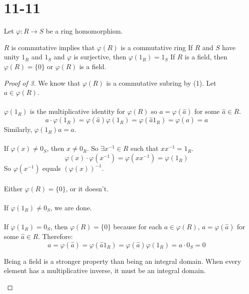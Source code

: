 \documentclass[class=scrartcl, crop=false]{standalone}
\date{2019-11-11}
\begin{document}
\section{11-11}

\begin{proposition}
  Let $\varphi: R \to S$ be a ring homomorphism.
  \begin{enumerate}
    \ii
    $R$ is commutative implies that $\varphi(R)$ is a commutative ring
    \ii
    If $R$ and $S$ have unity $1_R$ and $1_S$ and $\varphi$ is surjective, then $\varphi(1_R) = 1_S$
    \ii
    If $R$ is a field, then $\varphi(R) = \{0\}$  or $\varphi(R)$ is a field.
    \begin{proof}[Proof of 3]
      We know that $\varphi(R)$ is a commutative subring by (1). Let $a \in \varphi(R)$.
      \\\\
      $\varphi(1_R)$ is the multiplicative identity for $\varphi(R)$ so $a = \varphi(\hat{a})$ for some $\hat{a} \in R$.
      \[
        a \cdot \varphi(1_R) = \varphi(\hat{a})\varphi(1_R) = \varphi(\hat{a}1_R) = \varphi(\hat{a}) = a
      \] 
      Similarly, $\varphi(1_R)a = a$.
      \\\\
      If $\varphi(x) \neq 0_S$, then $x \neq 0_R$. So $\exists x^{-1} \in R$ such that $xx^{-1} = 1_R$.
      \[
        \varphi(x) \cdot \varphi(x^{-1}) = \varphi(xx^{-1}) = \varphi(1_R)
      \]
      So $\varphi(x^{-1})$ equals $(\varphi(x))^{-1}$.
      \\\\
      Either $\varphi(R) = \{0\}$, or it doesn't.
      \\\\
      If $\varphi(1_R) \neq 0_S$, we are done.
      \\\\
      If $\varphi(1_R) = 0_S$, then $\varphi(R) = \{0\}$ because for each $a \in \varphi(R)$, $a = \varphi(\hat{a})$ for some $\hat{a} \in R$. Therefore:
      \[
        a = \varphi(\hat{a}) = \varphi(\hat{a}1_R) = \varphi(\hat{a})\varphi(1_R) = a \cdot 0_S = 0
      \]

      \begin{recall}
        Being a field is a stronger property than being an integral domain. When every element has a multiplicative inverse, it must be an integral domain.
      \end{recall} 
      
    \end{proof} 
  \end{enumerate} 
\end{proposition} 
\end{document}
